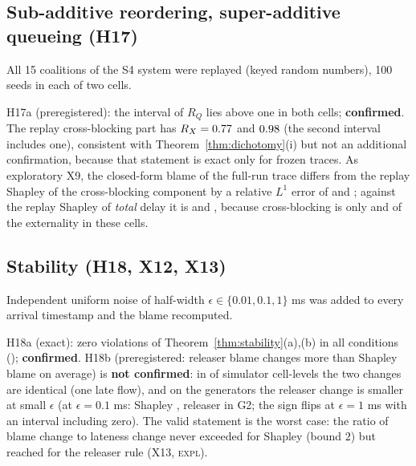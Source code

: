 \documentclass[11pt]{article}
\newcommand{\tagC}{\textsc{conf}}
\newcommand{\tagE}{\textsc{expl}}
\theoremstyle{definition}
\begin{document}
\subsection{Sub-additive reordering, super-additive queueing (H17)}\label{sec:val-dich}
All 15 coalitions of the S4 system were replayed (keyed random numbers), 100 seeds in each of two cells.
\begin{table}[h]
\centering\small

\caption{H17 (\tagC{} for $R_Q$; $R_X$ is \tagE{}): non-additivity ratios of Theorem~\ref{thm:dichotomy}(iii), interventional replay, seed-cluster intervals. The coalition identity gap is at most \FvIdGapB{} and replay-signature violations are \FvSigA{}.}
\end{table}
H17a (preregistered): the interval of $R_Q$ lies above one in both cells; \textbf{confirmed}. The replay cross-blocking part has $R_X=0.77{}$ \FvRXACI{} and $0.98{}$ \FvRXBCI{} (the second interval includes one), consistent with Theorem~\ref{thm:dichotomy}(i) but not an additional confirmation, because that statement is exact only for frozen traces. As exploratory X9, the closed-form blame of the full-run trace differs from the replay Shapley of the cross-blocking component by a relative $L^1$ error of \FvNineErrA{} \FvNineErrACI{} and \FvNineErrB{} \FvNineErrBCI{}; against the replay Shapley of \emph{total} delay it is \FvNineEA{} and \FvNineEB{}, because cross-blocking is only \FvShareXA{} and \FvShareXB{} of the externality in these cells.

\subsection{Stability (H18, X12, X13)}\label{sec:stab}
Independent uniform noise of half-width $\epsilon\in\{0.01,0.1,1\}$ ms was added to every arrival timestamp and the blame recomputed.
\begin{table}[h]
\centering\footnotesize

\caption{Stability (H18 cells C1--C3 at $\epsilon=0.1$ ms and exploratory X12 cells C5, G2, G3). Mean $L^1$ change of the per-packet blame vector over blocked packets; maximum over packets of (change of blame)/($L^1$ change of lateness).}
\end{table}
H18a (exact): zero violations of Theorem~\ref{thm:stability}(a),(b) in all conditions (\FvBoundViol{}); \textbf{confirmed}. H18b (preregistered: releaser blame changes more than Shapley blame on average) is \textbf{not confirmed}: in \FvStabTies{} of \FvStabCells{} simulator cell-levels the two changes are identical (one late flow), and on the generators the releaser change is smaller at small $\epsilon$ (at $\epsilon=0.1$ ms: Shapley \FvStabGtwoSh{}, releaser \FvStabGtwoRel{} in G2; the sign flips at $\epsilon=1$ ms with an interval including zero). The valid statement is the worst case: the ratio of blame change to lateness change never exceeded \FvRatioSh{} for Shapley (bound $2$) but reached \FvRatioRel{} for the releaser rule (X13, \tagE{}).
\end{document}
